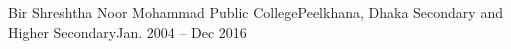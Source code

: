 \resumeSubheading
    {Bir Shreshtha Noor Mohammad Public College}{Peelkhana, Dhaka}
    {Secondary and Higher Secondary}{Jan. 2004 -- Dec 2016}
    \resumeItemListStart
    \resumeItemListEnd